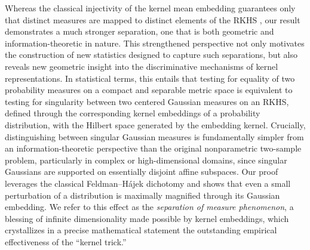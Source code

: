 \documentclass{article}
\begin{document}
Whereas the classical injectivity of the kernel mean embedding guarantees only that distinct measures are mapped to distinct elements of the RKHS \cite{muandet2017kernel}, our result demonstrates a much stronger separation, one that is both geometric and information-theoretic in nature.
This strengthened perspective not only motivates the construction of new statistics designed to capture such separations, but also reveals new geometric insight into the discriminative mechanisms of kernel representations.
 In statistical terms, this entails that testing for equality of two probability measures on a compact and separable metric space is equivalent to testing for singularity between two centered Gaussian measures on an RKHS, defined through the corresponding kernel embeddings of a probability distribution, with the Hilbert space generated by the embedding kernel. 
Crucially, distinguishing between singular Gaussian measures is fundamentally simpler from an information-theoretic perspective than the original nonparametric two-sample problem, particularly in complex or high-dimensional domains, since singular Gaussians are supported on essentially disjoint affine subspaces. Our proof leverages the classical Feldman–Hájek dichotomy \cite{feldman1958equivalence,hajek1958property} and shows that even a small perturbation of a distribution is maximally magnified through its Gaussian embedding. We refer to this effect as the \textit{separation of measure phenomenon}, a blessing of infinite dimensionality made possible by kernel embeddings, which crystallizes in a precise mathematical statement the outstanding empirical effectiveness of the “kernel trick.”


 
\end{document}
